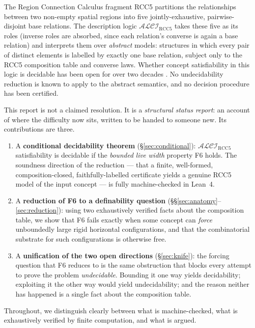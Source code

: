 \documentclass[11pt]{article}
\newcommand{\ALCIRCC}{\mathcal{ALCI}_{\mathrm{RCC5}}}
\theoremstyle{plain}
\theoremstyle{definition}
\begin{document}
The Region Connection Calculus fragment RCC5 partitions the
relationships between two non-empty spatial regions into five
jointly-exhaustive, pairwise-disjoint base relations. The description
logic $\ALCIRCC$ takes these five as its roles (inverse roles are
absorbed, since each relation's converse is again a base relation) and
interprets them over \emph{abstract} models: structures in which every
pair of distinct elements is labelled by exactly one base relation,
subject only to the RCC5 composition table and converse laws. Whether
concept satisfiability in this logic is decidable has been open for
over two decades \cite{wessel2003,lutzwolter2006}. No undecidability
reduction is known to apply to the abstract semantics, and no decision
procedure has been certified.

This report is not a claimed resolution. It is a \emph{structural
status report}: an account of where the difficulty now sits, written to
be handed to someone new. Its contributions are three.

\begin{enumerate}[leftmargin=1.6em]
\item A \textbf{conditional decidability theorem}
(\S\ref{sec:conditional}): $\ALCIRCC$ satisfiability is decidable if the
\emph{bounded live width} property F6 holds. The soundness direction of
the reduction --- that a finite, well-formed, composition-closed,
faithfully-labelled certificate yields a genuine RCC5 model of the
input concept --- is fully machine-checked in Lean~4.

\item A \textbf{reduction of F6 to a definability question}
(\S\S\ref{sec:anatomy}--\ref{sec:reduction}): using two exhaustively
verified facts about the composition table, we show that F6 fails
exactly when some concept can \emph{force} unboundedly large rigid
horizontal configurations, and that the combinatorial substrate for
such configurations is otherwise free.

\item A \textbf{unification of the two open directions}
(\S\ref{sec:knife}): the forcing question that F6 reduces to is the
same obstruction that blocks every attempt to prove the problem
\emph{undecidable}. Bounding it one way yields decidability; exploiting
it the other way would yield undecidability; and the reason neither has
happened is a single fact about the composition table.
\end{enumerate}

Throughout, we distinguish clearly between what is machine-checked, what
is exhaustively verified by finite computation, and what is argued.
\end{document}
